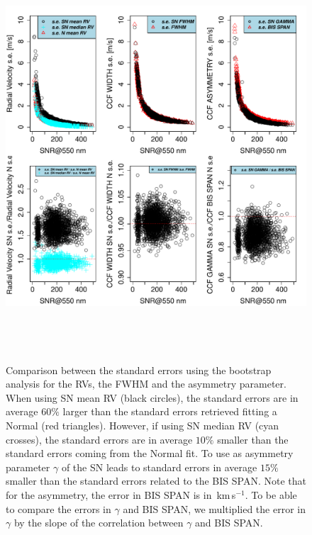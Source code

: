 \documentclass{aa}
\def\kms{\hbox{\,km\,s$^{-1}$}}       %
\begin{document}
%
\begin{figure}[htbp]
\begin{center}
\includegraphics[height = 6in]{[5]Errors_vs_SNR_all_stars.pdf} 
   \caption{Comparison between the standard errors using the bootstrap analysis for the RVs, the FWHM and the asymmetry parameter. When using SN mean RV (black circles), the standard errors are in average $60\%$ larger than the standard errors retrieved fitting a Normal (red triangles). However, if using SN median RV (cyan crosses), the standard errors are in average $10\%$ smaller than the standard errors coming from the Normal fit. To use as asymmetry parameter $\gamma$ of the SN leads to standard errors in average $15\%$ smaller than the standard errors related to the BIS SPAN. Note that for the asymmetry, the error in BIS SPAN is in \kms. To be able to compare the errors in $\gamma$ and BIS SPAN, we multiplied the error in $\gamma$ by the slope of the correlation between $\gamma$ and BIS SPAN.}
   \label{fig:se}
\end{center}
\end{figure}
\end{document}
